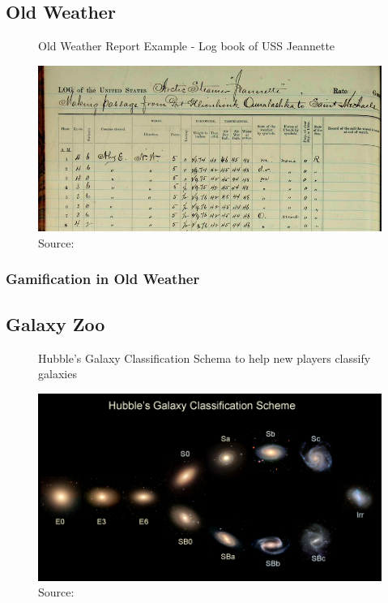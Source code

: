 \subsection{Old Weather}

\begin{figure}[ht]
    \centering
    \caption{Old Weather Report Example - Log book of USS Jeannette}
    \includegraphics[width=0.8\linewidth]{images/background/oldweather.jpg}
    \caption{Source: \cite{oldweather2015jeannette}}
    \label{fig:oldweather-logbook}
\end{figure}

\subsubsection{Gamification in Old Weather}

\subsection{Galaxy Zoo}

\begin{figure}[ht]
    \centering
    \caption{Hubble's Galaxy Classification Schema to help new players classify galaxies}
    \includegraphics[width=0.8\linewidth]{images/background/galaxyzoo-training.jpg}
    \caption{Source: \cite{galaxyzoo2010hubble}}
    \label{fig:galaxyzoo-hubble}
\end{figure}

